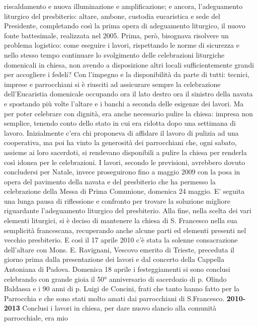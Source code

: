 riscaldamento e nuova illuminazione e amplificazione; e ancora, l'adeguamento liturgico del 
presbiterio: altare, ambone, custodia eucaristica e sede del Presidente, completando così la prima 
opera di adeguamento liturgico, il nuovo fonte battesimale, realizzata nel 2005.
Prima, però, bisognava risolvere un problema logistico: come eseguire i lavori, rispettando le norme 
di sicurezza e nello stesso tempo continuare lo svolgimento delle celebrazioni liturgiche domenicali 
in chiesa, non avendo a disposizione altri locali sufficientemente grandi per accogliere i fedeli?
Con l'impegno e la disponibilità da parte di tutti: tecnici, imprese e parrocchiani si è riusciti ad 
assicurare sempre la celebrazione dell'Eucaristia domenicale occupando ora il lato destro ora il 
sinistro della navata e spostando più volte l'altare e i banchi a seconda delle esigenze dei lavori.
Ma per poter celebrare con dignità, era anche necessario pulire la chiesa: impresa non 
semplice, tenendo conto dello stato in cui era ridotta dopo una settimana di lavoro. 
Inizialmente c'era chi proponeva di affidare il lavoro di pulizia ad una cooperativa, ma poi ha vinto 
la generosità dei parrocchiani che, ogni sabato, assieme ai loro sacerdoti, si rendevano disponibili a 
pulire la chiesa per renderla così idonea per le celebrazioni.
I lavori, secondo le previsioni, avrebbero dovuto concludersi per Natale, invece 
proseguirono fino a maggio 2009 con la posa in opera del pavimento della navata e del presbiterio 
che ha permesso la celebrazione della Messa di Prima Comunione, domenica 24 maggio. 
E' seguita una lunga pausa di riflessione e confronto per trovare la soluzione migliore riguardante 
l'adeguamento liturgico del presbiterio. Alla fine, nella scelta dei vari elementi liturgici, si è deciso 
di mantenere la chiesa di S. Francesco nella sua semplicità francescana, recuperando anche alcune 
parti ed elementi presenti nel vecchio presbiterio.
E così il 17 aprile 2010 c'è stata la solenne consacrazione dell'altare con Mons. E. 
Ravignani, Vescovo emerito di Trieste, preceduta il giorno prima dalla presentazione dei lavori e 
dal concerto della Cappella Antoniana di Padova. 
Domenica 18 aprile i festeggiamenti si sono conclusi celebrando con grande gioia il 50° 
anniversario di sacerdozio di p. Olindo Baldassa e i 90 anni di p. Luigi de Concini, frati che tanto 
hanno fatto per la Parrocchia e che sono stati molto amati dai parrocchiani di S.Francesco.
\bigbreak
{}
\noindent \textbf{2010-2013}
\medbreak
\noindent Conclusi i lavori in chiesa, per dare nuovo slancio alla comunità parrocchiale, era mio 
